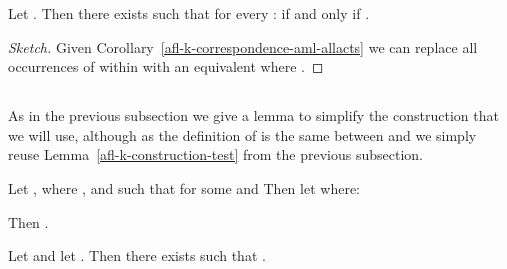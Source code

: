 \documentclass[twoside]{aiml14}
\begin{document}
  \begin{corollary}\label{afl-k-correspondence-afl-aml}
      Let . 
      Then there exists  
      such that for every : 
       if and only if
      .
  \end{corollary}

  \begin{proof}[Sketch]
      Given Corollary~\ref{afl-k-correspondence-aml-allacts} we can replace all
      occurrences of  
      within  with an equivalent  
      where .
  \end{proof}

  \subsection{\classKFF{}}

  As in the previous subsection we give a lemma to simplify the construction
  that we will use, although as the definition of  is the
  same between \classK{} and \classKFF{} we simply reuse
  Lemma~\ref{afl-k-construction-test} from the previous subsection.

  \begin{lemma}\label{afl-kff-construction-learning}
      Let ,
       where ,
      and  
      such that  
      for some  
      and  
      Then let  where:
      
      Then .
  \end{lemma}

  \begin{proposition}\label{afl-kff-correspondence}
      Let  and 
      let . 
      Then there exists  such that 
      .
  \end{proposition}
\end{document}
